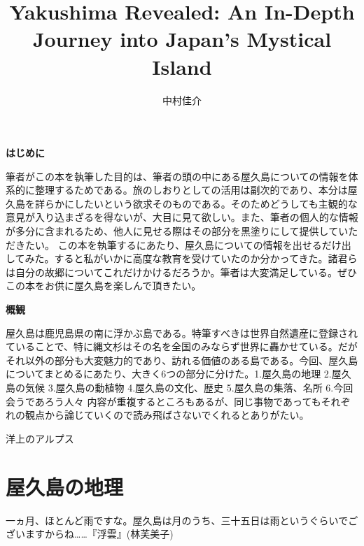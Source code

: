 \documentclass[10pt,titlepage,a5paper]{ltjsbook}
\begin{document}
  \thispagestyle{empty}
  \title{Yakushima Revealed: An In-Depth Journey into Japan's Mystical Island}
  \author{中村佳介}
  \maketitle
  \thispagestyle{empty}
  \begin{center}
    \textbf{\huge{はじめに}}\\
  \end{center}
  \vspace{2em}

    筆者がこの本を執筆した目的は、筆者の頭の中にある屋久島についての情報を体系的に整理するためである。旅のしおりとしての活用は副次的であり、本分は屋久島を詳らかにしたいという欲求そのものである。そのためどうしても主観的な意見が入り込まざるを得ないが、大目に見て欲しい。また、筆者の個人的な情報が多分に含まれるため、他人に見せる際はその部分を黒塗りにして提供していただきたい。
    この本を執筆するにあたり、屋久島についての情報を出せるだけ出してみた。すると私がいかに高度な教育を受けていたのか分かってきた。諸君らは自分の故郷についてこれだけかけるだろうか。筆者は大変満足している。ぜひこの本をお供に屋久島を楽しんで頂きたい。
  \vspace{4em}
  \begin{center}
    \textbf{\huge{概観}}\\
  \end{center}
  \vspace{2em}

  屋久島は鹿児島県の南に浮かぶ島である。特筆すべきは世界自然遺産に登録されていることで、特に縄文杉はその名を全国のみならず世界に轟かせている。だがそれ以外の部分も大変魅力的であり、訪れる価値のある島である。今回、屋久島についてまとめるにあたり、大きく6つの部分に分けた。1.屋久島の地理 2.屋久島の気候 3.屋久島の動植物 4.屋久島の文化、歴史 5.屋久島の集落、名所 6.今回会うであろう人々
  内容が重複するところもあるが、同じ事物であってもそれぞれの観点から論じていくので読み飛ばさないでくれるとありがたい。
  {
  \thispagestyle{empty}
  \tableofcontents
  \thispagestyle{empty}
  \setcounter{page}{0}
  }
  \begin{savequote}
    洋上のアルプス  
  \end{savequote}
  \chapter{屋久島の地理}
  \setcounter{page}{1}
  
  \begin{savequote}
    一ヵ月、ほとんど雨ですな。屋久島は月のうち、三十五日は雨というぐらいでございますからね……『浮雲』(林芙美子)
  \end{savequote}
\end{document}
